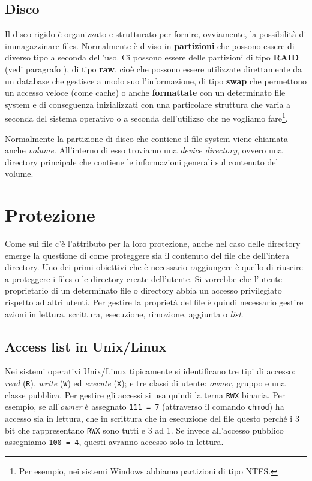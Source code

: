 % 
\subsection{Disco}
Il disco rigido è organizzato e strutturato per fornire, ovviamente, la possibilità di immagazzinare files. Normalmente è diviso in \textbf{partizioni} che possono essere di diverso tipo a seconda dell'uso. Ci possono essere delle partizioni di tipo \textbf{RAID} (vedi paragrafo ), di tipo \textbf{raw}, cioè che possono essere utilizzate direttamente da un database che gestisce a modo suo l'informazione, di tipo \textbf{swap} che permettono un accesso veloce (come cache) o anche \textbf{formattate} con un determinato file system e di conseguenza inizializzati con una particolare struttura che varia a seconda del sistema operativo o a seconda dell'utilizzo che ne vogliamo fare\footnote{Per esempio, nei sistemi Windows abbiamo partizioni di tipo NTFS.}.

Normalmente la partizione di disco che contiene il file system viene chiamata anche \textit{volume}. All'interno di esso troviamo una \textit{device directory}, ovvero una directory principale che contiene le informazioni generali sul contenuto del volume.

% 
\section{Protezione}\label{protection}
Come sui file c'è l'attributo per la loro protezione, anche nel caso delle directory emerge la questione di come proteggere sia il contenuto del file che dell'intera directory. Uno dei primi obiettivi che è necessario raggiungere è quello di riuscire a proteggere i files o le directory create dell'utente. Si vorrebbe che l'utente proprietario di un determinato file o directory abbia un accesso privilegiato rispetto ad altri utenti. Per gestire la proprietà del file è quindi necessario gestire azioni in lettura, scrittura, esecuzione, rimozione, aggiunta o \textit{list}.

\subsection{Access list in Unix/Linux}\label{permissions}
Nei sistemi operativi Unix/Linux tipicamente si identificano tre tipi di accesso: \textit{read} (\texttt{R}), \textit{write} (\texttt{W}) ed \textit{execute} (\texttt{X}); e tre classi di utente: \textit{owner}, gruppo e una classe pubblica. Per gestire gli accessi si usa quindi la terna \texttt{RWX} binaria. Per esempio, se all'\textit{owner} è assegnato \texttt{111 = 7} (attraverso il comando \texttt{chmod}) ha accesso sia in lettura, che in scrittura che in esecuzione del file questo perché i 3 bit che rappresentano \texttt{RWX} sono tutti e 3 ad 1. Se invece all'accesso pubblico assegniamo \texttt{100 = 4}, questi avranno accesso solo in lettura.

